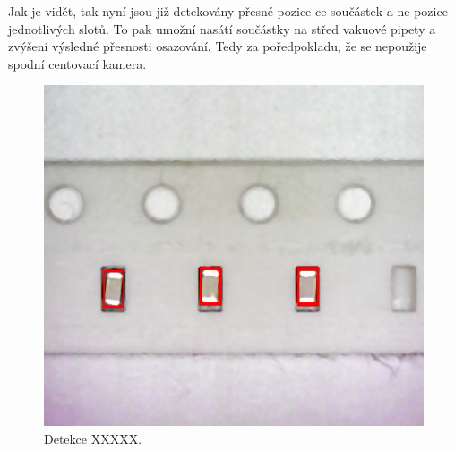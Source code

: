 Jak je vidět, tak nyní jsou již detekovány přesné pozice ce součástek a ne pozice jednotlivých slotů. To pak umožní nasátí součástky na střed vakuové pipety a zvýšení výsledné přesnosti osazování. Tedy za poředpokladu, že se nepoužije spodní centovací kamera. 
\begin{figure}[h!]
  \centering
    \includegraphics[width=0.5\linewidth]{obrazky/res3.png}%
    \caption{Detekce XXXXX.}
    \label{fig:tape4}
\end{figure}


